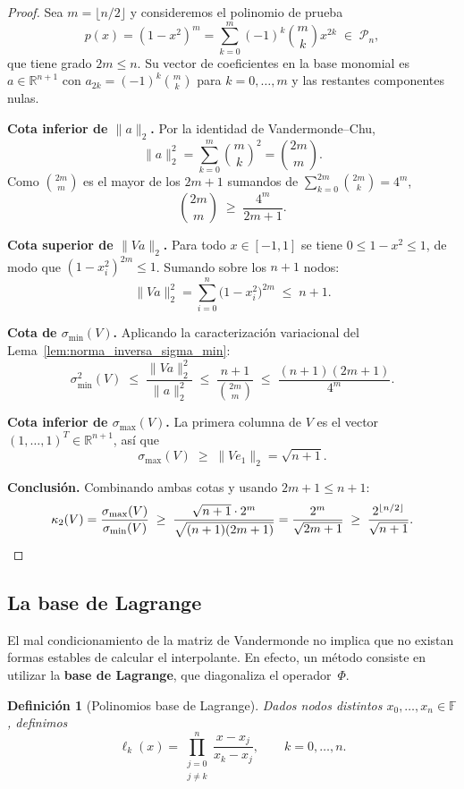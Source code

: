\documentclass[a4paper,11pt]{report}
\newtheorem{definition}[theorem]{Definición}
\begin{document}
\begin{proof}
Sea $m=\lfloor n/2\rfloor$ y consideremos el polinomio de prueba
\[
p(x)=(1-x^2)^m = \sum_{k=0}^{m}(-1)^k\binom{m}{k}x^{2k}\;\in\;\mathcal{P}_n,
\]
que tiene grado $2m\le n$.  Su vector de coeficientes en la base monomial es $a\in\mathbb{R}^{n+1}$ con $a_{2k}=(-1)^k\binom{m}{k}$ para $k=0,\ldots,m$ y las restantes componentes nulas.

\textbf{Cota inferior de $\|a\|_2$.}  Por la identidad de Vandermonde--Chu,
\[
\|a\|_2^2=\sum_{k=0}^m \binom{m}{k}^2=\binom{2m}{m}.
\]
Como $\binom{2m}{m}$ es el mayor de los $2m+1$ sumandos de $\sum_{k=0}^{2m}\binom{2m}{k}=4^m$,
\[
\binom{2m}{m}\;\ge\;\frac{4^m}{2m+1}.
\]

\textbf{Cota superior de $\|Va\|_2$.}  Para todo $x\in[-1,1]$ se tiene $0\le 1-x^2\le 1$, de modo que $(1-x_i^2)^{2m}\le 1$.  Sumando sobre los $n+1$ nodos:
\[
\|Va\|_2^2=\sum_{i=0}^n \bigl(1-x_i^2\bigr)^{2m}\;\le\; n+1.
\]

\textbf{Cota de $\sigma_{\min}(V)$.}  Aplicando la caracterización variacional del Lema~\ref{lem:norma_inversa_sigma_min}:
\[
\sigma_{\min}^2(V)\;\le\;\frac{\|Va\|_2^2}{\|a\|_2^2}
\;\le\;\frac{n+1}{\binom{2m}{m}}
\;\le\;\frac{(n+1)(2m+1)}{4^m}.
\]

\textbf{Cota inferior de $\sigma_{\max}(V)$.}  La primera columna de $V$ es el vector $(1,\ldots,1)^T\in\mathbb{R}^{n+1}$, así que
\[
\sigma_{\max}(V)\;\ge\;\|Ve_1\|_2=\sqrt{n+1}.
\]

\textbf{Conclusión.}  Combinando ambas cotas y usando $2m+1\le n+1$:
\[
\kappa_2(V)=\frac{\sigma_{\max}(V)}{\sigma_{\min}(V)}
\;\ge\;\frac{\sqrt{n+1}\cdot 2^m}{\sqrt{(n+1)(2m+1)}}
= \frac{2^m}{\sqrt{2m+1}}
\;\ge\;\frac{2^{\lfloor n/2\rfloor}}{\sqrt{n+1}}.\qedhere
\]
\end{proof}

\subsection{La base de Lagrange}\label{subsec:base_lagrange}

El mal condicionamiento de la matriz de Vandermonde no implica que no existan formas estables de calcular el interpolante. En efecto, un método consiste en utilizar la \textbf{base de Lagrange}, que diagonaliza el operador~$\Phi$.

\begin{definition}[Polinomios base de Lagrange]
Dados nodos distintos $x_0,\ldots,x_n\in\mathbb{F}$, definimos
\[
\ell_k(x) = \prod_{\substack{j=0\\j\neq k}}^n \frac{x-x_j}{x_k-x_j}, \qquad k=0,\ldots,n.
\]
\end{definition}
\end{document}
